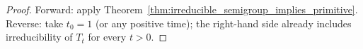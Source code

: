 \begin{proof}\leanok
    Forward: apply Theorem~\ref{thm:irreducible_semigroup_implies_primitive}.
    Reverse: take $t_0=1$ (or any positive time); the right-hand side
    already includes irreducibility of $T_t$ for every $t>0$.
\end{proof}

